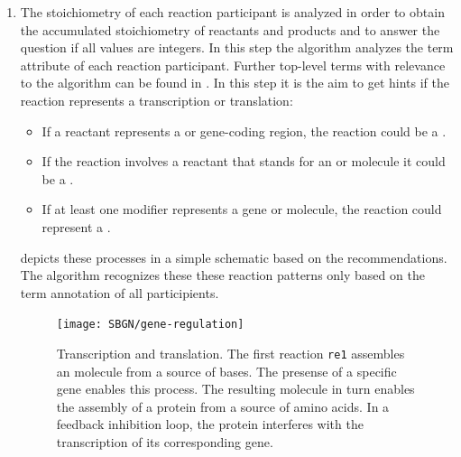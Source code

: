 \begin{enumerate}
  \item The stoichiometry of each reaction participant is analyzed in order to obtain the accumulated stoichiometry of reactants and products and to answer the question if all values are integers.
In this step the algorithm analyzes the \SBO term \citep{Courtot2011} attribute of each reaction participant.
Further top-level \SBO terms with relevance to the algorithm can be found in .
In this step it is the aim to get hints if the reaction represents a transcription or translation:
  \begin{itemize}
    \item If a reactant represents a \gene or gene-coding region, the reaction could be a \transcription.
    \item If the reaction involves a reactant that stands for an \RNA or \mRNA molecule it could be a \translation.
    \item If at least one modifier represents a gene or \RNA molecule, the reaction could represent a \translation.
  \end{itemize}
   depicts these processes in a simple schematic based on the \SBGN recommendations.
  The algorithm recognizes these these reaction patterns only based on the \SBO term annotation of all participients.
  \begin{figure}
    \texttt{[image: SBGN/gene-regulation]}
    \caption[Transcription and translation]{Transcription and translation.
The first reaction \texttt{re1} assembles an \mRNA molecule from a source of bases.
The presense of a specific gene enables this process.
The resulting \mRNA molecule in turn enables the assembly of a protein from a source of amino acids.
In a feedback inhibition loop, the protein interferes with the transcription of its corresponding gene.}
    \label{fig:TranscriptionAndTranslation}
  \end{figure}


\end{enumerate}
